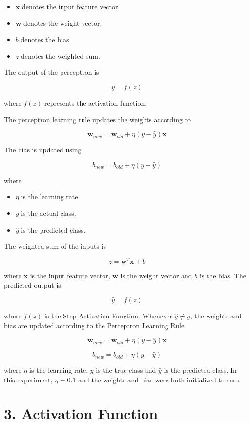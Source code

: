 \documentclass[11pt,a4paper]{article}
\begin{document}
\begin{itemize}
\item $\mathbf{x}$ denotes the input feature vector.
\item $\mathbf{w}$ denotes the weight vector.
\item $b$ denotes the bias.
\item $z$ denotes the weighted sum.
\end{itemize}

The output of the perceptron is

\[
\hat{y}=f(z)
\]

where $f(z)$ represents the activation function.

The perceptron learning rule updates the weights according to

\[
\mathbf{w}_{new}
=
\mathbf{w}_{old}
+
\eta
(y-\hat{y})
\mathbf{x}
\]

The bias is updated using

\[
b_{new}
=
b_{old}
+
\eta
(y-\hat{y})
\]

where

\begin{itemize}
\item $\eta$ is the learning rate.
\item $y$ is the actual class.
\item $\hat{y}$ is the predicted class.
\end{itemize}





The weighted sum of the inputs is

\[
z=\mathbf{w}^{T}\mathbf{x}+b
\]

where $\mathbf{x}$ is the input feature vector, $\mathbf{w}$ is the weight vector and $b$ is the bias. The predicted output is

\[
\hat{y}=f(z)
\]

where $f(z)$ is the Step Activation Function. Whenever $\hat{y}\neq y$, the weights and bias are updated according to the Perceptron Learning Rule

\[
\mathbf{w}_{new}=\mathbf{w}_{old}+\eta(y-\hat{y})\mathbf{x}
\]

\[
b_{new}=b_{old}+\eta(y-\hat{y})
\]

where $\eta$ is the learning rate, $y$ is the true class and $\hat{y}$ is the predicted class. In this experiment, $\eta = 0.1$ and the weights and bias were both initialized to zero.
\section*{3. Activation Function}
\end{document}
